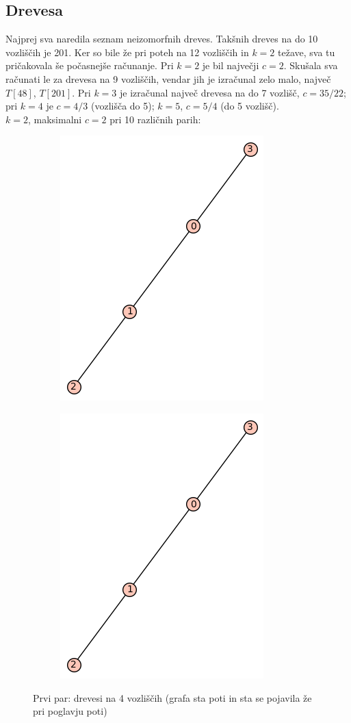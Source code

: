\documentclass[12pt, a4paper]{article}
\begin{document}
\begin{center}
\begin{center}
\end{center}

\subsection{Drevesa}
Najprej sva naredila seznam neizomorfnih dreves. Takšnih dreves na do 10 vozliščih je 201. Ker so bile že pri poteh na 12 vozliščih in $k=2$ težave, sva tu pričakovala še počasnejše računanje. Pri $k=2$ je bil največji $c=2$. Skušala sva računati le za drevesa na 9 vozliščih, vendar jih je izračunal zelo malo, največ $T[48]$, $T[201]$. Pri $k=3$ je izračunal največ drevesa na do 7 vozlišč, $c=35/22$; pri $k=4$ je $c=4/3$ (vozlišča do 5); $k=5$, $c=5/4$ (do 5 vozlišč). \\

$k=2$, maksimalni $c=2$ pri 10 različnih parih:\\

\begin{center}
\begin{figure}[!htb]
\centering
\begin{subfigure}{0.5\textwidth}
  \centering
  \includegraphics[width=0.4\linewidth]{t-3}
\end{subfigure}%
\begin{subfigure}{0.5\textwidth}
  \centering
  \includegraphics[width=0.5\linewidth]{t-3}
\end{subfigure}
\caption{Prvi par: drevesi na 4 vozliščih (grafa sta poti in sta se pojavila že pri poglavju poti)}
\label{fig:test}
\end{figure}
\end{center}


\end{center}
\end{document}
